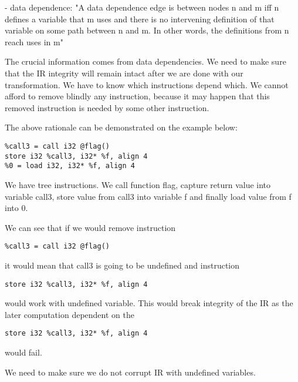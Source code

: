 \documentclass[12pt, twoside]{fithesis2}
\renewcommand{\_}{\leavevmode \kern0.07em\vbox{\hrule width0.4em}}
\begin{document}
- data dependence: "A data dependence edge is between nodes n and m iff n
defines a variable that m uses and there is no intervening definition of that
variable on some path between n and m. In other words, the definitions from n
reach uses in m"

The crucial information comes from data dependencies. We need to make sure that
the IR integrity will remain intact after we are done with our transformation.
We have to know which instructions depend which. We cannot afford to remove
blindly any instruction, because it may happen that this removed instruction is
needed by some other instruction.

The above rationale can be demonstrated on the example below:

\begin{verbatim}
%call3 = call i32 @flag()
store i32 %call3, i32* %f, align 4
%0 = load i32, i32* %f, align 4
\end{verbatim}

We have tree instructions. We call function flag, capture return value into
variable call3, store value from call3 into variable f and finally load value
from f into 0.

We can see that if we would remove instruction

\begin{verbatim}
%call3 = call i32 @flag()
\end{verbatim}

it would mean that call3 is going to be undefined and instruction

\begin{verbatim}
store i32 %call3, i32* %f, align 4
\end{verbatim}

would work with undefined variable. This would break integrity of the IR as the
later computation dependent on the

\begin{verbatim}
store i32 %call3, i32* %f, align 4
\end{verbatim}

would fail.

We need to make sure we do not corrupt IR with undefined variables.
\end{document}
